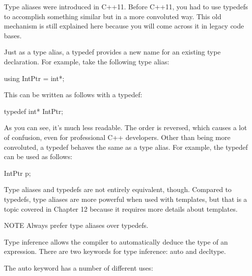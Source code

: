 
Type aliases were introduced in C++11. Before C++11, you had to use typedefs to accomplish something similar but in a more convoluted way. This old mechanism is still explained here because you will come across it in legacy code bases.

Just as a type alias, a typedef provides a new name for an existing type declaration. For example, take the following type alias:

\begin{cpp}
using IntPtr = int*;
\end{cpp}

This can be written as follows with a typedef:

\begin{cpp}
typedef int* IntPtr;
\end{cpp}

As you can see, it’s much less readable. The order is reversed, which causes a lot of confusion, even for professional C++ developers. Other than being more convoluted, a typedef behaves the same as a type alias. For example, the typedef can be used as follows:

\begin{cpp}
IntPtr p;
\end{cpp}

Type aliases and typedefs are not entirely equivalent, though. Compared to typedefs, type aliases are more powerful when used with templates, but that is a topic covered in Chapter 12 because it requires more details about templates.

\begin{myNotic}{NOTE}
Always prefer type aliases over typedefs.
\end{myNotic}


Type inference allows the compiler to automatically deduce the type of an expression. There are two keywords for type inference: auto and decltype.


The auto keyword has a number of different uses:

